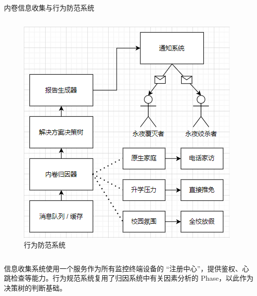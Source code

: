 \begin{frame}{内卷信息收集与行为防范系统}
\begin{columns}
            \begin{figure}
                \centering
                 \includegraphics[width=\textwidth]{contents/figure/collector-part-2.png}
                \caption{行为防范系统}
                \label{fig:collector-part-2}
            \end{figure}
        \end{columns}

        \small 信息收集系统使用一个服务作为所有监控终端设备的 “注册中心”，提供鉴权、心跳检查等能力。行为规范系统复用了归因系统中有关因素分析的 Phase，以此作为决策树的判断基础。
    \end{frame}


